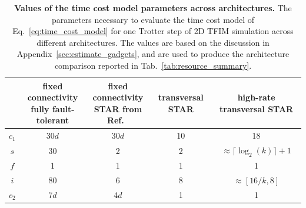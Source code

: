 \documentclass[aps, prx, reprint, superscriptaddress, longbibliography, floatfix]{revtex4-2}
\begin{document}
\begin{table}[ht]
\centering
\renewcommand{\arraystretch}{1.25}
\begin{tabular}{c|c|c|c|c}
\hline \hline
&\makecell{fixed connectivity \\ fully fault-tolerant}& \makecell{fixed connectivity  \\ STAR from Ref.~\cite{Toshio2024}} &   transversal STAR & high-rate transversal STAR \\
\hline
$c_1$ & 30$d$ & 30$d$ & 10 & 18  \\
\hline
$s$ & 30 & 2 & 2 & $\approx \lceil \log_2(k)\rceil+ 1$ \\
\hline
$f$ & 1 & 1 & 1 & 1 \\
\hline
$i$ & 80 & 6 & 8 & $\approx [16/k,8]$ \\
\hline
$c_2$ & 7$d$ & 4$d$ & 1 & 1 \\
\hline\hline
\end{tabular}
\caption{\textbf{Values of the time cost model parameters across architectures.} The parameters necessary to evaluate the time cost model of Eq.~\ref{eq:time_cost_model} for one Trotter step of 2D TFIM simulation across different architectures. The values are based on the discussion in Appendix~\ref{sec:estimate_gadgets}, and are used to produce the architecture comparison reported in Tab.~\ref{tab:resource_summary}.}
\label{tab:parameters_estimates}
\end{table}
\end{document}
